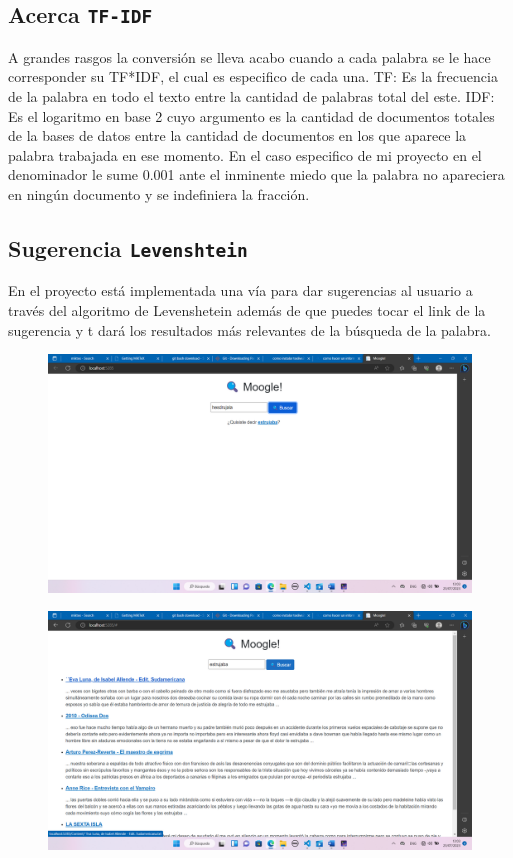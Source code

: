 \documentclass [a4paper,12pt]{article}
\begin{document}
\subsection{Acerca \texttt{TF-IDF}}\label{sub:center}
A grandes rasgos la conversión se lleva acabo cuando a cada palabra se le hace corresponder su TF*IDF, el cual es especifico de cada una.
TF: Es la frecuencia de la palabra en todo el texto entre la cantidad de palabras total del este.
IDF: Es el logaritmo en base 2 cuyo argumento es la cantidad de documentos totales de la bases de datos entre la cantidad de documentos en los que aparece la palabra trabajada en ese momento. En el caso especifico de mi proyecto en el denominador le sume 0.001 ante el inminente miedo que la palabra no apareciera en ningún documento y se indefiniera la fracción.
\subsection{Sugerencia \texttt{Levenshtein}}\label{sub:center}
En el proyecto está implementada una vía para dar sugerencias al usuario a través del algoritmo de Levenshetein además de que puedes tocar el link de la sugerencia y t dará los resultados más relevantes de la búsqueda de la palabra.
\begin{figure}[h]
	\center
	\includegraphics[width = 14cm]{sugerencia.png}
	\label{fig:navegador}
\end{figure}
\begin{figure}[h]
	\center
	\includegraphics[width = 14cm]{buscada.png}
	\label{fig:navegador}
\end{figure}
\end{document}
